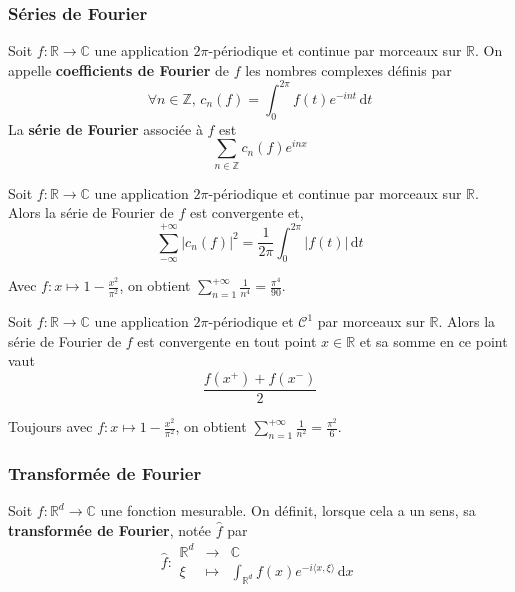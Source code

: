 	\subsubsection{Séries de Fourier}
	
	
	\begin{definition}
		Soit $f : \mathbb{R} \rightarrow \mathbb{C}$ une application $2\pi$-périodique et continue par morceaux sur $\mathbb{R}$. On appelle \textbf{coefficients de Fourier} de $f$ les nombres complexes définis par
		\[ \forall n \in \mathbb{Z}, \, c_n(f) = \int_{0}^{2\pi} f(t) e^{-int} \, \mathrm{d}t \]
		La \textbf{série de Fourier} associée à $f$ est
		\[ \sum_{n \in \mathbb{Z}} c_n(f)e^{inx} \]
	\end{definition}
	
	\begin{theorem}[Parseval]
		Soit $f : \mathbb{R} \rightarrow \mathbb{C}$ une application $2\pi$-périodique et continue par morceaux sur $\mathbb{R}$. Alors la série de Fourier de $f$ est convergente et,
		\[ \sum_{-\infty}^{+\infty} |c_n(f)|^2 = \frac{1}{2\pi} \int_0^{2\pi} |f(t)| \, \mathrm{d}t \]
	\end{theorem}
	
	\begin{example}
		Avec $f : x \mapsto 1 - \frac{x^2}{\pi^2}$, on obtient $\sum_{n=1}^{+\infty} \frac{1}{n^4} = \frac{\pi^4}{90}$.
	\end{example}
	
	\begin{theorem}
		Soit $f : \mathbb{R} \rightarrow \mathbb{C}$ une application $2\pi$-périodique et $\mathcal{C}^1$ par morceaux sur $\mathbb{R}$. Alors la série de Fourier de $f$ est convergente en tout point $x \in \mathbb{R}$ et sa somme en ce point vaut
		\[ \frac{f(x^+) + f(x^-)}{2} \]
	\end{theorem}
	
	\begin{example}
		Toujours avec $f : x \mapsto 1 - \frac{x^2}{\pi^2}$, on obtient $\sum_{n=1}^{+\infty} \frac{1}{n^2} = \frac{\pi^2}{6}$.
	\end{example}
	
	\subsubsection{Transformée de Fourier}
	
	
	\begin{definition}
		Soit $f : \mathbb{R}^d \rightarrow \mathbb{C}$ une fonction mesurable. On définit, lorsque cela a un sens, sa \textbf{transformée de Fourier}, notée $\widehat{f}$ par
		\[
		\widehat{f} :
		\begin{array}{ccc}
			\mathbb{R}^d &\rightarrow& \mathbb{C} \\
			\xi &\mapsto& \int_{\mathbb{R}^d} f(x) e^{-i \langle x, \xi \rangle} \, \mathrm{d}x
		\end{array}
		\]
	\end{definition}
	
